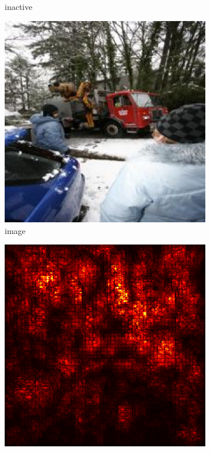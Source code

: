 \documentclass[preprint,12pt]{elsarticle}
\begin{document}
\begin{figure}
\begin{subfigure}{0.14\textwidth}
        \caption{inactive}
    \end{subfigure}
    \begin{subfigure}{0.14\linewidth}
        \centering
        \includegraphics[width=\linewidth]{../visualizations/examples/imagenette/cnn/images/1.png}
        \caption{image}
    \end{subfigure}
    \hfill
    \begin{subfigure}{0.14\linewidth}
        \centering
        \includegraphics[width=\linewidth]{../visualizations/examples/imagenette/cnn/saliency_map/1.png}

\end{subfigure}
\end{figure}
\end{document}
